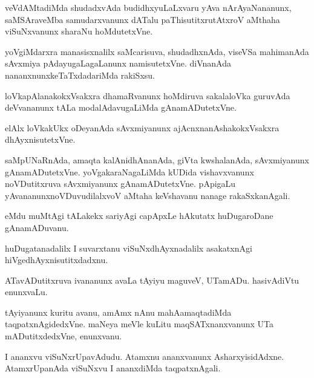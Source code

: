 \documentclass{article}
\begin{document}
\begin{mn}
veVdAMtadiMda shudadxvAda budidhxyuLaLxvaru yAva nArAyaNananunx, saMSAraveMba  
samudarxvanunx dATalu paThisutitxrutAtxroV aMthaha viSuNxvanunx sharaNu hoMdutetxVne.
\end{mn}

\begin{mn}
yoVgiMdarxra manasisxnalilx saMcarisuva,  shudadhxnAda,  viseVSa mahimanAda 
sAvxmiya pAdayugaLagaLanunx namisutetxVne. diVnanAda nananxnunxkeTaTxdadariMda rakiSxsu.
\end{mn}

\begin{mn}
loVkapAlanakokxVsakxra dhamaRvanunx hoMdiruva sakalaloVka guruvAda deVvananunx 
tALa modalAdavugaLiMda gAnamADutetxVne.
\end{mn}

\begin{mn}
elAlx loVkakUkx oDeyanAda sAvxmiyanunx ajAcnxnanAshakokxVsakxra dhAyxnisutetxVne.
\end{mn}

\begin{mn}
saMpUNaRnAda,  amaqta kalAnidhAnanAda,  giVta kwshalanAda, sAvxmiyanunx 
gAnamADutetxVne.  yoVgakaraNagaLiMda kUDida vishavxvanunx noVDutitxruva 
sAvxmiyanunx gAnamADutetxVne.  pApigaLu yAvananunxnoVDuvudilalxvoV aMtaha 
keVshavanu nanage rakaSxkanAgali.
\end{mn}

\begin{mn}
eMdu muMtAgi tALakekx sariyAgi capApxLe hAkutatx huDugaroDane gAnamADuvanu. 
\end{mn}

\begin{mn}
huDugatanadalilx I suvarxtanu viSuNxdhAyxnadalilx asakatxnAgi hiVgedhAyxnisutitxdadxnu.
\end{mn}

\begin{mn}
ATavADutitxruva ivananunx avaLa tAyiyu maguveV, UTamADu. hasivAdiVtu enunxvaLu.
\end{mn}

\begin{mn}
tAyiyanunx kuritu avanu, amAmx nAnu mahAamaqtadiMda  taqpatxnAgidedxVne.  
maNeya meVle kuLitu maqSATxnanxvanunx UTa mADutitxdedxVne, enunxvanu. 
\end{mn}

\begin{mn}
I ananxvu viSuNxrUpavAdudu.  Atamxnu  ananxvanunx AsharxyisidAdxne.  
AtamxrUpanAda  viSuNxvu I ananxdiMda  taqpatxnAgali.
\end{mn}
\end{document}
